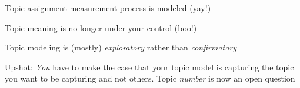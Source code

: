 \documentclass{mediumfoils}
\begin{document}
%
%
%
%
%
%
%
%
% 
%
%
%
%
%
%
%
%
%
%
%
%
%
%
%
%
%




Topic assignment measurement process is modeled  (yay!)

Topic meaning is no longer under your control (boo!)

Topic modeling is (mostly) \textit{exploratory} rather than \textit{confirmatory}

Upshot: 
\ita
\itm \textit{You} have to make the case that your topic model is capturing the topic you want to be capturing and not others.
\itm Topic \textit{number} is now an open question
\itz

\end{document}
